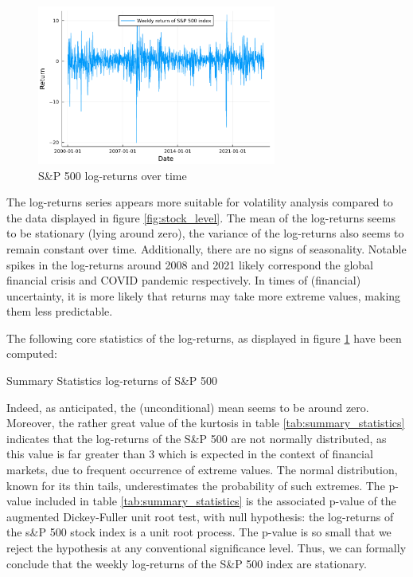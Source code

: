 \begin{figure}[H]
    \centering
    \includegraphics[width=0.7\textwidth]{figures/stock_returns.pdf}
    \caption{S\&P 500 log-returns over time}
    \label{fig:stock_returns}
\end{figure}
The log-returns series appears more suitable for volatility analysis compared to the data displayed in figure \ref{fig:stock_level}. The mean of the log-returns seems to be stationary (lying around zero), the variance of the log-returns also seems to remain constant over time. Additionally, there are no signs of seasonality. Notable spikes in the log-returns around 2008 and 2021 likely correspond the global financial crisis and COVID pandemic respectively. In times of (financial) uncertainty, it is more likely that returns may take more extreme values, making them less predictable.
\newline

The following core statistics of the log-returns, as displayed in figure \ref{fig:stock_returns} have been computed:

\begin{table}[H]
    \centering

\caption{Summary Statistics log-returns of S\&P 500} 
\label{tab:summary_statistics}
\end{table}
Indeed, as anticipated, the (unconditional) mean seems to be around zero. Moreover, the rather great value of the kurtosis in table \ref{tab:summary_statistics} indicates that the log-returns of the S\&P 500 are not normally distributed, as this value is far greater than 3 which is expected in the context of financial markets, due to frequent occurrence of extreme values. The normal distribution, known for its thin tails, underestimates the probability of such extremes. The p-value included in table \ref{tab:summary_statistics} is the associated p-value of the augmented Dickey-Fuller unit root test, with null hypothesis: the log-returns of the s\&P 500 stock index is a unit root process.  The p-value is so small that we reject the hypothesis at any conventional significance level. Thus, we can formally conclude that the weekly log-returns of the S\&P 500 index are stationary.


